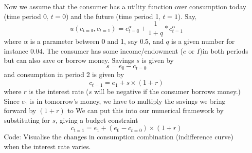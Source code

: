 \documentclass[a4paper, 12pt, reqno]{article}
\begin{document}
Now we assume that the consumer has a utility function over consumption today (time period 0, $t = 0$) and the future (time period 1, $t = 1$). Say, 
$$ u(c_{t = 0},c_{t = 1}) = c_{t = 0}^{\alpha} + \frac{1}{1+q} * c_{t = 1}^{\alpha} $$ 
where $\alpha$ is a parameter between 0 and 1, say 0.5, and $q$ is a given number for instance 0.04. 
The consumer has some income/endowment ($e$ or $I$)in both periods but can also save or borrow money. Savings $s$ is given by 
$$ s = e_0 - c_{t = 0} $$ 
and consumption in period 2 is given by 
$$ c_{t = 1} = e_1 + s \times (1+r)$$ 
where $r$ is the interest rate ($s$ will be negative if the consumer borrows money.) Since $e_1$ is in tomorrow's money, we have to multiply the savings we bring forward by $(1 + r)$ to We can put this into our 
numerical framework by substituting for $s$, giving a budget constraint 
$$ c_{t = 1} = e_1+ (e_0- c_{t = 0}) \times (1+r)$$
\hfill
Code: Visualise the changes in consumption combination (indifference curve) when the interest rate varies. 
\end{document}
